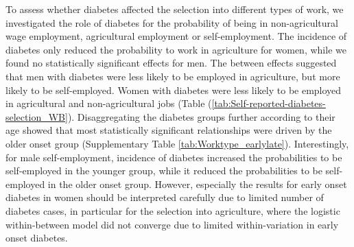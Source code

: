 \documentclass[10pt,letterpaper]{article}
\begin{document}
To assess whether diabetes affected the selection into different types of work, we investigated the role of diabetes for the probability of being in non-agricultural wage employment, agricultural employment or self-employment. The incidence of diabetes only reduced the probability to work in agriculture for women, while we found no statistically significant effects for men. The between effects suggested that men with diabetes were less likely to be employed in agriculture, but more likely to be self-employed. Women with diabetes were less likely to be employed in agricultural and non-agricultural jobs  (Table (\ref{tab:Self-reported-diabetes-selection_WB}). Disaggregating the diabetes groups further according to their age showed that most statistically significant relationships were driven by the older onset group (Supplementary Table \ref{tab:Worktype_earlylate}). Interestingly, for male self-employment, incidence of diabetes increased the probabilities to be self-employed in the younger group, while it reduced the probabilities to be self-employed in the older onset group. However, especially the results for early onset diabetes in women should be interpreted carefully due to limited number of diabetes cases, in particular for the selection into agriculture, where the logistic within-between model did not converge due to limited within-variation in early onset diabetes.
\end{document}
